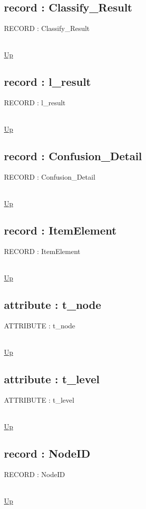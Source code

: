 \subsection*{record : Classify\_Result}
\hypertarget{ecldoc:ml_core.types.classify_result}{RECORD : Classify\_Result} \\
\hyperlink{ecldoc:ML_Core.Types}{Up} \\
\par
\subsection*{record : l\_result}
\hypertarget{ecldoc:ml_core.types.l_result}{RECORD : l\_result} \\
\hyperlink{ecldoc:ML_Core.Types}{Up} \\
\par
\subsection*{record : Confusion\_Detail}
\hypertarget{ecldoc:ml_core.types.confusion_detail}{RECORD : Confusion\_Detail} \\
\hyperlink{ecldoc:ML_Core.Types}{Up} \\
\par
\subsection*{record : ItemElement}
\hypertarget{ecldoc:ml_core.types.itemelement}{RECORD : ItemElement} \\
\hyperlink{ecldoc:ML_Core.Types}{Up} \\
\par
\subsection*{attribute : t\_node}
\hypertarget{ecldoc:ml_core.types.t_node}{ATTRIBUTE : t\_node} \\
\hyperlink{ecldoc:ML_Core.Types}{Up} \\
\par
\subsection*{attribute : t\_level}
\hypertarget{ecldoc:ml_core.types.t_level}{ATTRIBUTE : t\_level} \\
\hyperlink{ecldoc:ML_Core.Types}{Up} \\
\par
\subsection*{record : NodeID}
\hypertarget{ecldoc:ml_core.types.nodeid}{RECORD : NodeID} \\
\hyperlink{ecldoc:ML_Core.Types}{Up} \\
\par

